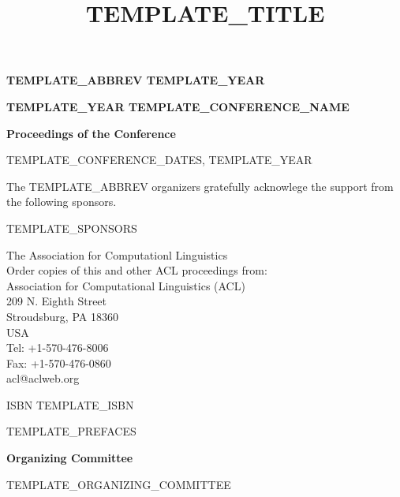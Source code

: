 \documentclass[10pt]{article}
\date{}
\title{TEMPLATE_TITLE}
\begin{document}
\begin{titlepage}
   \begin{center}
       \vspace{1cm}

       \textbf{TEMPLATE_ABBREV TEMPLATE_YEAR}

       \vspace{4cm}

       \textbf{TEMPLATE_YEAR TEMPLATE_CONFERENCE_NAME}

       \vfill

       \textbf{Proceedings of the Conference}

       \vspace{5cm}


       TEMPLATE_CONFERENCE_DATES, TEMPLATE_YEAR

   \end{center}
\end{titlepage}
\newpage

\setcounter{page}{2}
The TEMPLATE_ABBREV organizers gratefully acknowlege the support from the following sponsors.

\bigskip
TEMPLATE_SPONSORS

\newpage


\textcopyright The Association for Computationl Linguistics\\
\vspace{5cm}
Order copies of this and other ACL proceedings from:\\

Association for Computational Linguistics (ACL)\\
209 N. Eighth Street\\
Stroudsburg, PA 18360\\
USA\\
Tel: +1-570-476-8006\\
Fax: +1-570-476-0860\\
acl@aclweb.org\\

\vspace{5cm}

ISBN TEMPLATE_ISBN
\newpage


TEMPLATE_PREFACES

\begin{center}
\textbf{Organizing Committee}
\end{center}
TEMPLATE_ORGANIZING_COMMITTEE
\newpage
\end{document}
